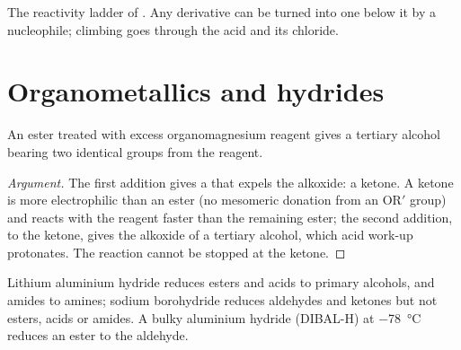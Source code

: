 \begin{omfigure}

{\small The reactivity ladder of . Any derivative can be turned into
one below it by a nucleophile; climbing goes through the acid and its chloride.}
\end{omfigure}

\section{Organometallics and hydrides}

\begin{proposition}\label{prop:b2:acyl-substitution:grignard-ester}
An ester treated with excess organomagnesium reagent gives a tertiary alcohol bearing two
identical groups from the reagent.
\end{proposition}

\begin{proof}[Argument]
The first addition gives a  that expels the alkoxide: a ketone. A ketone
is more electrophilic than an ester (no mesomeric donation from an $\mathrm{OR'}$ group) and reacts with
the reagent faster than the remaining ester; the second addition, to the ketone, gives the alkoxide
of a tertiary alcohol, which acid work-up protonates. The reaction cannot be stopped at the ketone.
\end{proof}

\begin{proposition}\label{prop:b2:acyl-substitution:hydrides}
Lithium aluminium hydride reduces esters and acids to primary alcohols, and amides to amines;
sodium borohydride reduces aldehydes and ketones but not esters, acids or amides. A bulky aluminium
hydride (DIBAL-H) at \qty{-78}{\degreeCelsius} reduces an ester to the aldehyde.
\end{proposition}

